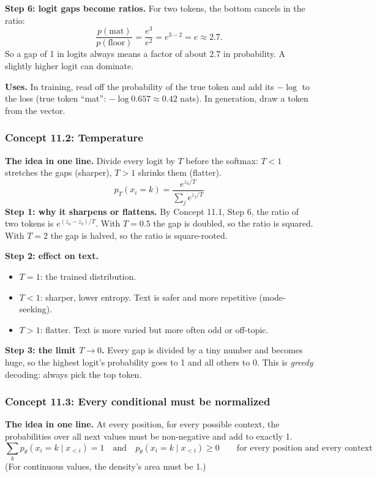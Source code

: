 \documentclass[12pt,a4paper]{article}
\begin{document}
\textbf{Step 6: logit gaps become ratios.} For two tokens, the bottom cancels in the ratio:
\[
\frac{p(\text{mat})}{p(\text{floor})}=\frac{e^{3}}{e^{2}}=e^{3-2}=e\approx2.7 .
\]
So a gap of 1 in logits always means a factor of about 2.7 in probability. A slightly higher logit can dominate.

\textbf{Uses.} In training, read off the probability of the true token and add its $-\log$ to the loss (true token ``mat'': $-\log0.657\approx0.42$ nats). In generation, draw a token from the vector.

\subsubsection{Concept 11.2: Temperature}\label{c11-2}

\textbf{The idea in one line.} Divide every logit by $T$ before the softmax: $T<1$ stretches the gaps (sharper), $T>1$ shrinks them (flatter).
\[
p_T(x_i=k)=\frac{e^{z_k/T}}{\sum_j e^{z_j/T}}
\]
\textbf{Step 1: why it sharpens or flattens.} By Concept 11.1, Step 6, the ratio of two tokens is $e^{(z_a-z_b)/T}$. With $T=0.5$ the gap is doubled, so the ratio is squared. With $T=2$ the gap is halved, so the ratio is square-rooted.

\textbf{Step 2: effect on text.}
\begin{itemize}[nosep]
  \item $T=1$: the trained distribution.
  \item $T<1$: sharper, lower entropy. Text is safer and more repetitive (mode-seeking).
  \item $T>1$: flatter. Text is more varied but more often odd or off-topic.
\end{itemize}

\textbf{Step 3: the limit $T\to0$.} Every gap is divided by a tiny number and becomes huge, so the highest logit's probability goes to 1 and all others to 0. This is \emph{greedy} decoding: always pick the top token.

\subsubsection{Concept 11.3: Every conditional must be normalized}\label{c11-3}

\textbf{The idea in one line.} At every position, for every possible context, the probabilities over all next values must be non-negative and add to exactly 1.
\[
\sum_k p_\theta(x_i=k\mid x_{<i})=1\quad\text{and}\quad p_\theta(x_i=k\mid x_{<i})\ge0\qquad\text{for every position and every context}
\]
(For continuous values, the density's area must be 1.)
\end{document}
